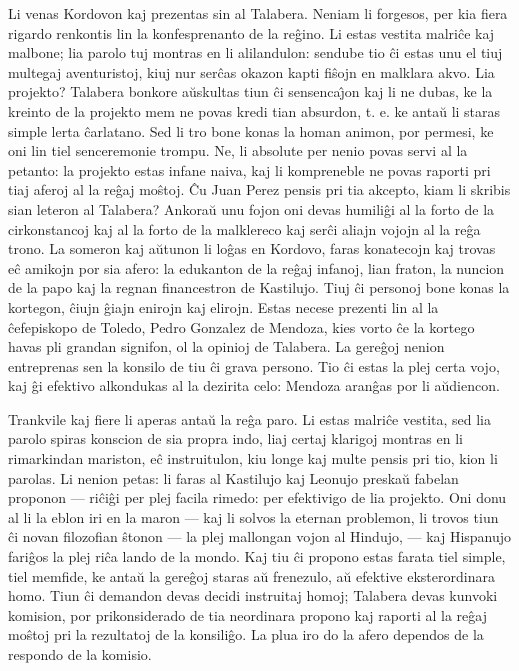    Li venas Kordovon kaj prezentas sin al Talabera. Neniam li forgesos,
per kia fiera rigardo renkontis lin la konfesprenanto de la
re\^gino. Li estas vestita malri\^ce kaj malbone; lia parolo tuj
montras en li alilandulon: sendube tio \^ci estas unu el tiuj
multegaj aventuristoj, kiuj nur ser\^cas okazon kapti fi\^sojn en
malklara akvo. Lia projekto? Talabera bonkore a\u uskultas tiun \^ci
sensenca\^{\j}on kaj li ne dubas, ke la kreinto de la projekto mem
ne povas kredi tian absurdon, t. e. ke anta\u u li staras simple
lerta \^carlatano. Sed li tro bone konas la homan animon, por
permesi, ke oni lin tiel senceremonie trompu. Ne, li absolute per
nenio povas servi al la petanto: la projekto estas infane naiva, kaj
li kompreneble ne povas raporti pri tiaj aferoj al la re\^gaj
mo\^stoj. \^Cu Juan Perez pensis pri tia akcepto, kiam li skribis
sian leteron al Talabera? Ankora\u u unu fojon oni devas humili\^gi
al la forto de la cirkonstancoj kaj al la forto de la malklereco kaj
ser\^ci aliajn vojojn al la re\^ga trono. La someron kaj a\u utunon
li lo\^gas en Kordovo, faras konatecojn kaj trovas e\^c amikojn por
sia afero: la edukanton de la re\^gaj infanoj, lian fraton, la
nuncion de la papo kaj la regnan financestron de Kastilujo. Tiuj
\^ci personoj bone konas la kortegon, \^ciujn \^giajn enirojn kaj
elirojn. Estas necese prezenti lin al la \^cefepiskopo de Toledo,
Pedro Gonzalez de Mendoza, kies vorto \^ce la kortego havas pli
grandan signifon, ol la opinioj de Talabera. La gere\^goj nenion
entreprenas sen la konsilo de tiu \^ci grava persono. Tio \^ci estas
la plej certa vojo, kaj \^gi efektivo alkondukas al la dezirita
celo: Mendoza aran\^gas por li a\u udiencon.

   Trankvile kaj fiere li aperas anta\u u la re\^ga paro. Li estas malri\^ce
vestita, sed lia parolo spiras konscion de sia propra indo, liaj
certaj klarigoj montras en li rimarkindan mariston, e\^c
instruitulon, kiu longe kaj multe pensis pri tio, kion li parolas.
Li nenion petas: li faras al Kastilujo kaj Leonujo preska\u u
fabelan proponon --- ri\^ci\^gi per plej facila rimedo: per
efektivigo de lia projekto. Oni donu al li la eblon iri en la maron
--- kaj li solvos la eternan problemon, li trovos tiun \^ci novan
filozofian \^stonon --- la plej mallongan vojon al Hindujo, --- kaj
Hispanujo fari\^gos la plej ri\^ca lando de la mondo. Kaj tiu \^ci
propono estas farata tiel simple, tiel memfide, ke anta\u u la
gere\^goj staras a\u u frenezulo, a\u u efektive eksterordinara
homo. Tiun \^ci demandon devas decidi instruitaj homoj; Talabera
devas kunvoki komision, por prikonsiderado de tia neordinara propono
kaj raporti al la re\^gaj mo\^stoj pri la rezultatoj de la
konsili\^go. La plua iro do la afero dependos de la respondo de la
komisio.

